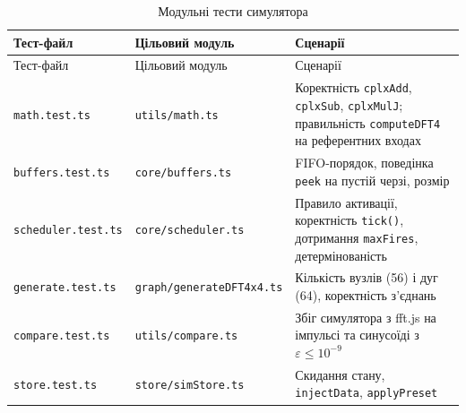 \documentclass[
]{article}
\begin{document}
\begin{longtable}[]{@{}
  >{\raggedright\arraybackslash}p{}
  >{\raggedright\arraybackslash}p{}
  >{\raggedright\arraybackslash}p{}@{}}
\caption{Модульні тести симулятора}\tabularnewline
\toprule\noalign{}
\begin{minipage}[b]{\linewidth}\raggedright
Тест-файл
\end{minipage} & \begin{minipage}[b]{\linewidth}\raggedright
Цільовий модуль
\end{minipage} & \begin{minipage}[b]{\linewidth}\raggedright
Сценарії
\end{minipage} \\
\midrule\noalign{}
\endfirsthead
\toprule\noalign{}
\begin{minipage}[b]{\linewidth}\raggedright
Тест-файл
\end{minipage} & \begin{minipage}[b]{\linewidth}\raggedright
Цільовий модуль
\end{minipage} & \begin{minipage}[b]{\linewidth}\raggedright
Сценарії
\end{minipage} \\
\midrule\noalign{}
\endhead
\bottomrule\noalign{}
\endlastfoot
\texttt{math.test.ts} & \texttt{utils}\texttt{/}\texttt{math.ts} &
Коректність \texttt{cplxAdd}, \texttt{cplxSub}, \texttt{cplxMulJ};
правильність \texttt{computeDFT4} на референтних входах \\
\texttt{buffers.test.ts} & \texttt{core}\texttt{/}\texttt{buffers.ts} &
FIFO-порядок, поведінка \texttt{peek} на пустій черзі, розмір \\
\texttt{scheduler.test.ts} &
\texttt{core}\texttt{/}\texttt{scheduler.ts} & Правило активації,
коректність \texttt{tick}\texttt{()}, дотримання \texttt{maxFires},
детермінованість \\
\texttt{generate.test.ts} & \texttt{graph}\texttt{/generateDFT4x4.ts} &
Кількість вузлів (56) і дуг (64), коректність з'єднань \\
\texttt{compare.test.ts} & \texttt{utils}\texttt{/}\texttt{compare.ts} &
Збіг симулятора з fft.js на імпульсі та синусоїді з
\(\varepsilon \leq 10^{- 9}\) \\
\texttt{store.test.ts} & \texttt{store}\texttt{/}\texttt{simStore.ts} &
Скидання стану, \texttt{injectData}, \texttt{applyPreset} \\
\end{longtable}
\end{document}
